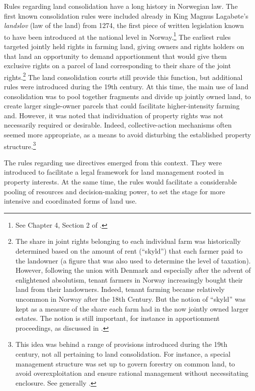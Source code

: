 Rules regarding land consolidation have a long history in Norwegian law. The first known consolidation rules were included already in King Magnus Lagabøte's \emph{landslov} (law of the land) from 1274, the first piece of written legislation known to have been introduced at the national level in Norway.\footnote{See Chapter 4, Section 2 of \cite{nou02}.} The earliest rules targeted jointly held rights in farming land, giving owners and rights holders on that land an opportunity to demand apportionment that would give them exclusive rights on a parcel of land corresponding to their share of the joint rights.\footnote{The share in joint rights belonging to each individual farm was historically determined based on the amount of rent (``skyld'') that each farmer paid to the landowner (a figure that was also used to determine the level of taxation). However, following the union with Denmark and especially after the advent of enlightened absolutism, tenant farmers in Norway increasingly bought their land from their landowners. Indeed, tenant farming became relatively uncommon in Norway after the 18th Century. But the notion of ``skyld'' was kept as a measure of the share each farm had in the now jointly owned larger estates. The notion is still important, for instance in apportionment proceedings, as discussed in \cite{ravna09a}.} The land consolidation courts still provide this function, but additional rules were introduced during the 19th century. At this time, the main use of land consolidation was to pool together fragments and divide up jointly owned land, to create larger single-owner parcels that could facilitate higher-intensity farming and. However, it was noted that individuation of property rights was not necessarily required or desirable. Indeed, collective-action mechanisms often seemed more appropriate, as a means to avoid disturbing the established property structure.\footnote{This idea was behind a range of provisions introduced during the 19th century, not all pertaining to land consolidation. For instance, a special management structure was set up to govern forestry on common land, to avoid overexploitation and ensure rational management without necessitating enclosure. See generally \cite{stenseth10a}.}

The rules regarding use directives emerged from this context. They were introduced to facilitate a legal framework for land management rooted in property interests. At the same time, the rules would facilitate a considerable pooling of resources and decision-making power, to set the stage for more intensive and coordinated forms of land use.


